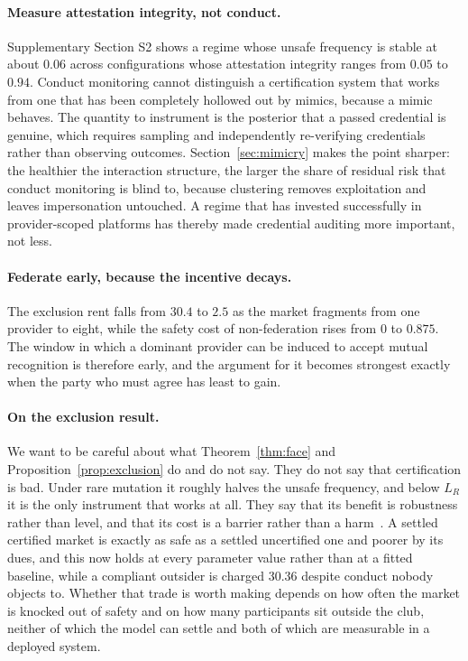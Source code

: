 \documentclass[preprint,12pt]{elsarticle}
\theoremstyle{plain}
\theoremstyle{definition}
\begin{document}
\paragraph{Measure attestation integrity, not conduct.} Supplementary
Section S2 shows a regime whose unsafe frequency is stable at about $0.06$ across
configurations whose attestation integrity ranges from $0.05$ to $0.94$.
Conduct monitoring cannot distinguish a certification system that works from
one that has been completely hollowed out by mimics, because a mimic
behaves.
The quantity to instrument is the posterior that a passed credential is
genuine, which requires sampling and independently re-verifying credentials
rather than observing outcomes. Section~\ref{sec:mimicry} makes the point
sharper: the healthier the interaction structure, the larger the share of
residual risk that conduct monitoring is blind to, because clustering removes
exploitation and leaves impersonation untouched. A regime that has invested
successfully in provider-scoped platforms has thereby made credential auditing
more important, not less.

\paragraph{Federate early, because the incentive decays.} The exclusion rent
falls from $30.4$ to $2.5$ as the market fragments from one provider to eight,
while the safety cost of non-federation rises from $0$ to $0.875$. The window
in which a dominant provider can be induced to accept mutual recognition is
therefore early, and the argument for it becomes strongest exactly when the
party who must agree has least to gain.

\paragraph{On the exclusion result.} We want to be careful about what
Theorem~\ref{thm:face} and Proposition~\ref{prop:exclusion} do and do not
say. They do not say that certification is bad. Under rare mutation it roughly
halves
the unsafe frequency, and below $L_R$ it is the only instrument that works at
all. They say that its benefit is robustness rather than level, and that its
cost is a barrier rather than a harm~\citep{leland1979quacks}. A settled certified
market is exactly as safe as a settled uncertified one and poorer by its dues,
and this now holds at every parameter value rather than at a fitted baseline,
while a compliant outsider is charged $30.36$ despite conduct nobody objects
to. Whether that trade
is worth making depends on how often the market is knocked out of safety and
on how many participants sit outside the club, neither of which the model can
settle and both of which are measurable in a deployed system.
\end{document}
